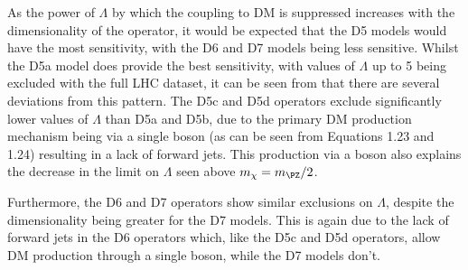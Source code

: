 As the power of $\Lambda$ by which the coupling to \ac{DM} is suppressed increases with the dimensionality of the operator, it would be expected that the D5 models would have the most sensitivity, with the D6 and D7 models being less sensitive. Whilst the D5a model does provide the best sensitivity, with values of $\Lambda$ up to 5 \TeV being excluded with the full LHC dataset, it can be seen from  that there are several deviations from this pattern. The D5c and D5d operators exclude significantly lower values of $\Lambda$ than D5a and D5b, due to the primary \ac{DM} production mechanism being via a single \PZ boson (as can be seen from Equations 1.23 and 1.24) resulting in a lack of forward jets. This production via a \PZ boson also explains the decrease in the limit on $\Lambda$ seen above $m_{\chi}=m_{\PZ}/2$.

Furthermore, the D6 and D7 operators show similar exclusions on $\Lambda$, despite the dimensionality being greater for the D7 models. This is again due to the lack of forward jets in the D6 operators which, like the D5c and D5d operators, allow \ac{DM} production through a single \PZ boson, while the D7 models don't.


